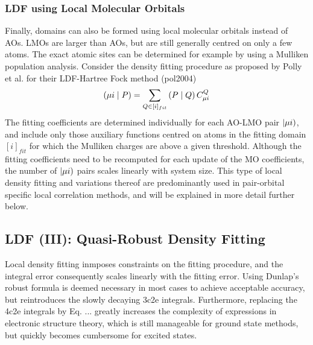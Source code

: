 
\subsubsection{LDF using Local Molecular Orbitals}
Finally, domains can also be formed using local molecular orbitals instead of AOs. LMOs are larger than AOs, but are still generally centred on only a few atoms. The exact atomic sites can be determined for example by using a Mulliken population analysis. Consider the density fitting procedure as proposed by Polly et al. for their LDF-Hartree Fock method (pol2004)
\begin{equation}
\left( \mu i \mid P \right) = \sum_{Q \in [i]_{fit}} \left( P \mid Q \right) C^Q_{\mu i}
\end{equation}
The fitting coefficients are determined individually for each AO-LMO pair $\left\lvert \mu i \right)$, and include only those auxiliary functions centred on atoms in the fitting domain $[i]_{fit}$ for which the Mulliken charges are above a given threshold. Although the fitting coefficients need to be recomputed for each update of the MO coefficients, the number of $\left\lvert \mu i \right)$ pairs scales linearly with system size. This type of local density fitting and variations thereof are predominantly used in pair-orbital specific local correlation methods, and will be explained in more detail further below. 


\subsection{LDF (III): Quasi-Robust Density Fitting}

Local density fitting inmposes constraints on the fitting procedure, and the integral error consequently scales linearly with the fitting error. Using Dunlap's robust formula is deemed necessary in most cases to achieve acceptable accuracy, but reintroduces the slowly decaying 3c2e integrals. Furthermore, replacing the 4c2e integrals by Eq. ... greatly increases the complexity of expressions in electronic structure theory, which is still manageable for ground state methods, but quickly becomes cumbersome for excited states.

